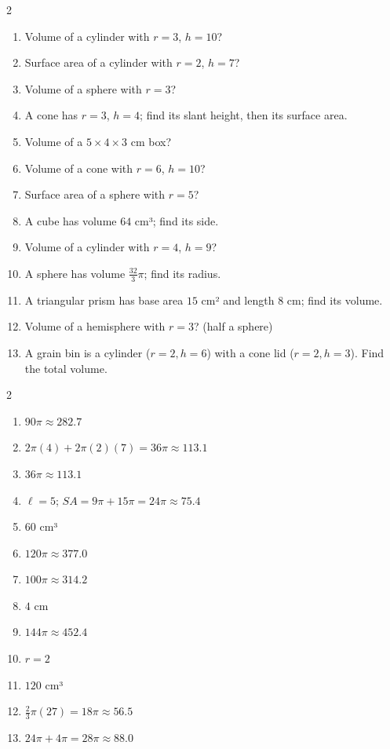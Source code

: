 \documentclass[11pt]{article}
\begin{document}
\begin{recapbox}
\begin{multicols}{2}
\small
\begin{enumerate}[leftmargin=*,itemsep=3pt]
  \item Volume of a cylinder with $r=3$, $h=10$?
  \item Surface area of a cylinder with $r=2$, $h=7$?
  \item Volume of a sphere with $r=3$?
  \item A cone has $r=3$, $h=4$; find its slant height, then its surface area.
  \item Volume of a $5\times4\times3$ cm box?
  \item Volume of a cone with $r=6$, $h=10$?
  \item Surface area of a sphere with $r=5$?
  \item A cube has volume $64$ cm³; find its side.
  \item Volume of a cylinder with $r=4$, $h=9$?
  \item A sphere has volume $\tfrac{32}{3}\pi$; find its radius.
  \item A triangular prism has base area $15$ cm² and length $8$ cm; find its volume.
  \item Volume of a hemisphere with $r=3$? (half a sphere)
  \item A grain bin is a cylinder ($r=2,h=6$) with a cone lid ($r=2,h=3$). Find the total volume.
\end{enumerate}
\end{multicols}
\end{recapbox}

\begin{keybox}
\begin{multicols}{2}
\small
\begin{enumerate}[leftmargin=*,itemsep=3pt]
  \item $90\pi\approx282.7$
  \item $2\pi(4)+2\pi(2)(7)=36\pi\approx113.1$
  \item $36\pi\approx113.1$
  \item $\ell=5$; $SA=9\pi+15\pi=24\pi\approx75.4$
  \item $60$ cm³
  \item $120\pi\approx377.0$
  \item $100\pi\approx314.2$
  \item $4$ cm
  \item $144\pi\approx452.4$
  \item $r=2$
  \item $120$ cm³
  \item $\tfrac23\pi(27)=18\pi\approx56.5$
  \item $24\pi+4\pi=28\pi\approx88.0$
\end{enumerate}
\end{multicols}
\end{keybox}
\end{document}
